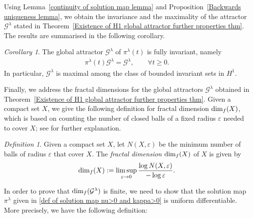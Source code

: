 \documentclass[reqno]{amsart}%
\theoremstyle{definition}
\theoremstyle{remark}
\numberwithin{equation}{section}
\newtheorem{corollary}[theorem]{Corollary}
\newtheorem{definition}[theorem]{Definition}
\newcommand{\1}{\mathbf{1}}
\newcommand{\dimf}{\text{\rm dim}_{f}}
\newcommand{\Gg}{\mathcal{G}^{\lambda}}
\newcommand{\pin}{\pi^{\lambda}}
\numberwithin{equation}{section}
\numberwithin{theorem}{section}
\numberwithin{figure}{section}
\begin{document}
Using Lemma~\ref{continuity of solution map lemma} and Proposition~\ref{Backwards uniqueness lemma}, we obtain the invariance and the maximality of the attractor $\Gg$ stated in Theorem~\ref{Existence of H1 global attractor further properties thm}. The results are summarised in the following corollary.

\begin{corollary}
The global attractor $\Gg$ of $\pin(t)$ is fully invariant, namely
\begin{align*}
\pin(t)\Gg=\Gg,\qquad \forall t\ge0.
\end{align*}
In particular, $\Gg$ is maximal among the class of bounded invariant sets in $H^1$.
\end{corollary}

Finally, we address the fractal dimensions for the global attractors $\Gg$ obtained in Theorem~\ref{Existence of H1 global attractor further properties thm}. Given a compact set $X$, we give the following definition for fractal dimension $\dimf(X)$, which is based on counting the number of closed balls of a fixed radius $\varepsilon$ needed to cover $X$; see \cite{R13} for further explanation. 

\begin{definition}\label{fractal dimension def}
Given a compact set $X$, let $N(X,\varepsilon)$ be the minimum number of balls of radius $\varepsilon$ that cover $X$. The {\it fractal dimension} $\dimf (X)$ of $X$ is given by
\begin{align*}
\dimf(X) := \limsup_{\varepsilon\to0}\frac{\log N(X, \varepsilon)}{-\log\varepsilon}.
\end{align*}
\end{definition}

In order to prove that $\dimf (\Gg)$ is finite, we need to show that the solution map $\pin$ given in \eqref{def of solution map nu>0 and kappa>0} is uniform differentiable. More precisely, we have the following definition:
\end{document}

